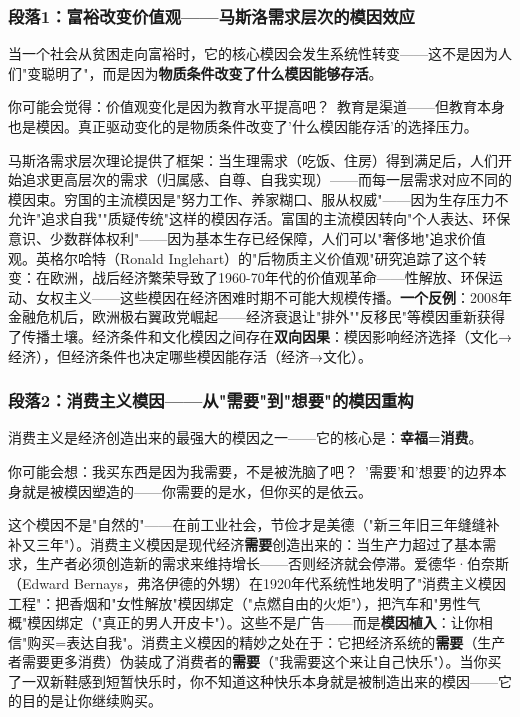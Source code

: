 \documentclass[../main.tex]{subfiles}
\begin{document}
	\subsubsection*{段落1：富裕改变价值观——马斯洛需求层次的模因效应}

	当一个社会从贫困走向富裕时，它的核心模因会发生系统性转变——这不是因为人们"变聪明了"，而是因为\textbf{物质条件改变了什么模因能够存活}。

	\begin{tcolorbox}[colback=yellow!5, title=\textit{读者行为预测}]

		你可能会觉得：价值观变化是因为教育水平提高吧？\ 教育是渠道——但教育本身也是模因。真正驱动变化的是物质条件改变了'什么模因能存活'的选择压力。

	\end{tcolorbox}

马斯洛需求层次理论提供了框架：当生理需求（吃饭、住房）得到满足后，人们开始追求更高层次的需求（归属感、自尊、自我实现）——而每一层需求对应不同的模因束。穷国的主流模因是"努力工作、养家糊口、服从权威"——因为生存压力不允许"追求自我""质疑传统"这样的模因存活。富国的主流模因转向"个人表达、环保意识、少数群体权利"——因为基本生存已经保障，人们可以"奢侈地"追求价值观。英格尔哈特（Ronald Inglehart）的"后物质主义价值观"研究追踪了这个转变：在欧洲，战后经济繁荣导致了1960-70年代的价值观革命——性解放、环保运动、女权主义——这些模因在经济困难时期不可能大规模传播。\textbf{一个反例}：2008年金融危机后，欧洲极右翼政党崛起——经济衰退让"排外""反移民"等模因重新获得了传播土壤。经济条件和文化模因之间存在\textbf{双向因果}：模因影响经济选择（文化→经济），但经济条件也决定哪些模因能存活（经济→文化）。

	\subsubsection*{段落2：消费主义模因——从"需要"到"想要"的模因重构}

	消费主义是经济创造出来的最强大的模因之一——它的核心是：\textbf{幸福=消费}。

	\begin{tcolorbox}[colback=yellow!5, title=\textit{读者行为预测}]

		你可能会想：我买东西是因为我需要，不是被洗脑了吧？\ '需要'和'想要'的边界本身就是被模因塑造的——你需要的是水，但你买的是依云。

	\end{tcolorbox}

这个模因不是"自然的"——在前工业社会，节俭才是美德（"新三年旧三年缝缝补补又三年"）。消费主义模因是现代经济\textbf{需要}创造出来的：当生产力超过了基本需求，生产者必须创造新的需求来维持增长——否则经济就会停滞。爱德华·伯奈斯（Edward Bernays，弗洛伊德的外甥）在1920年代系统性地发明了"消费主义模因工程"：把香烟和"女性解放"模因绑定（"点燃自由的火炬"），把汽车和"男性气概"模因绑定（"真正的男人开皮卡"）。这些不是广告——而是\textbf{模因植入}：让你相信"购买=表达自我"。消费主义模因的精妙之处在于：它把经济系统的\textbf{需要}（生产者需要更多消费）伪装成了消费者的\textbf{需要}（"我需要这个来让自己快乐"）。当你买了一双新鞋感到短暂快乐时，你不知道这种快乐本身就是被制造出来的模因——它的目的是让你继续购买。
\end{document}
